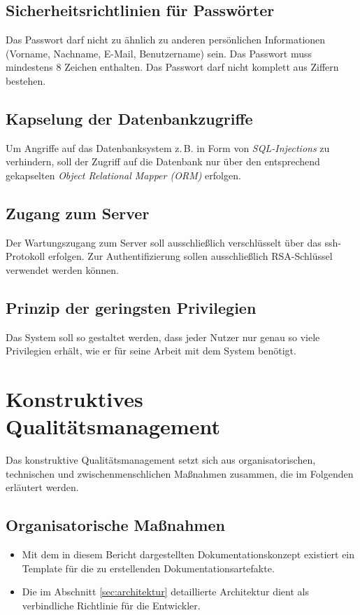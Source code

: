 \documentclass[a4paper,11pt,listof=numbered,glossary=totoc,parskip=half,toc=bib]{scrreprt}
\newcommand{\zB}{\mbox{z.\,B.}\xspace}
\begin{document}
	\subsection{Sicherheitsrichtlinien für Passwörter}
	 Das Passwort darf nicht zu ähnlich zu anderen persönlichen Informationen (Vorname, Nachname, E-Mail, Benutzername) sein.
    Das Passwort muss mindestens 8 Zeichen enthalten.
    Das Passwort darf nicht komplett aus Ziffern bestehen.	
    
    \subsection{Kapselung der Datenbankzugriffe}
    Um Angriffe auf das Datenbanksystem \zB in Form von \textit{SQL-Injections} zu verhindern, soll der Zugriff auf die Datenbank nur über den entsprechend gekapselten \textit{Object Relational Mapper (ORM)} erfolgen.
	
	\subsection{Zugang zum Server}
	Der Wartungszugang zum Server soll ausschließlich verschlüsselt über das \Gls{ssh}-Protokoll erfolgen. Zur Authentifizierung sollen ausschließlich RSA-Schlüssel verwendet werden können.
	
	\subsection{Prinzip der geringsten Privilegien}
	Das System soll so gestaltet werden, dass jeder Nutzer nur genau so viele Privilegien erhält, wie er für seine Arbeit mit dem System benötigt.
	
	\section{Konstruktives Qualitätsmanagement}
	Das konstruktive Qualitätsmanagement setzt sich aus organisatorischen, technischen und zwischenmenschlichen Maßnahmen zusammen, die im Folgenden erläutert werden.
	
	\subsection{Organisatorische Maßnahmen}
	\begin{itemize}
		\item Mit dem in diesem Bericht dargestellten Dokumentationskonzept existiert ein Template für die zu erstellenden Dokumentationsartefakte.
		\item Die im Abschnitt \ref{sec:architektur} detaillierte Architektur dient als verbindliche Richtlinie für die Entwickler.
	\end{itemize}		
	
\end{document}
